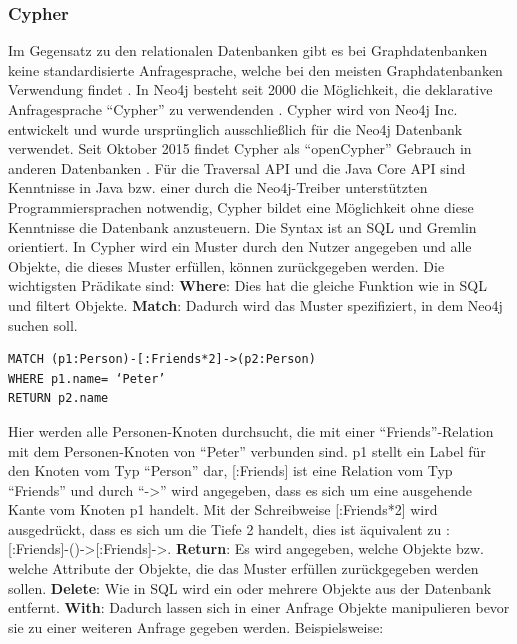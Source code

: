 \subsubsection{Cypher}
Im Gegensatz zu den relationalen Datenbanken gibt es bei Graphdatenbanken keine standardisierte Anfragesprache, welche bei den meisten Graphdatenbanken Verwendung findet \parencite{han2011survey}. In Neo4j besteht seit 2000 die Möglichkeit, die deklarative Anfragesprache “Cypher” zu verwendenden  \parencite{francis2018cypher}. Cypher wird von Neo4j Inc. entwickelt und wurde ursprünglich ausschließlich für die Neo4j Datenbank verwendet. Seit Oktober 2015  findet Cypher als “openCypher” Gebrauch in anderen Datenbanken \parencite{francis2018cypher}. Für die Traversal API und die Java Core API sind Kenntnisse in Java bzw. einer durch die Neo4j-Treiber unterstützten Programmiersprachen notwendig, Cypher bildet eine Möglichkeit ohne diese Kenntnisse die  Datenbank anzusteuern\parencite{vukotic2015neo4j}. Die Syntax ist an SQL und Gremlin orientiert. In Cypher wird ein Muster durch den Nutzer angegeben und alle Objekte, die dieses Muster erfüllen, können zurückgegeben werden. Die wichtigsten  Prädikate sind: \newline
\textbf{Where}: Dies hat die gleiche Funktion wie in SQL und filtert Objekte. \newline
\textbf{Match}: Dadurch wird das Muster spezifiziert, in dem Neo4j suchen soll.
\begin{Verbatim}[frame=single]
MATCH (p1:Person)-[:Friends*2]->(p2:Person) 
WHERE p1.name= ‘Peter’ 
RETURN p2.name
\end{Verbatim}
Hier werden alle Personen-Knoten durchsucht, die mit einer “Friends”-Relation mit dem Personen-Knoten von “Peter” verbunden sind. p1 stellt ein Label für den Knoten vom Typ “Person” dar, [:Friends] ist eine Relation vom Typ “Friends” und durch “->” wird angegeben, dass es sich um eine ausgehende Kante vom Knoten p1 handelt. Mit der Schreibweise [:Friends*2] wird ausgedrückt, dass es sich um die Tiefe 2 handelt, dies ist äquivalent zu : [:Friends]-()->[:Friends]->. \newline
\textbf{Return}: Es wird angegeben, welche Objekte bzw. welche Attribute der Objekte, die das Muster erfüllen zurückgegeben werden sollen.\newline
\textbf{Delete}: Wie in SQL  wird ein  oder mehrere Objekte aus der Datenbank entfernt.\newline
\textbf{With}: Dadurch lassen sich in einer Anfrage Objekte manipulieren bevor sie zu einer weiteren Anfrage gegeben werden. Beispielsweise:
